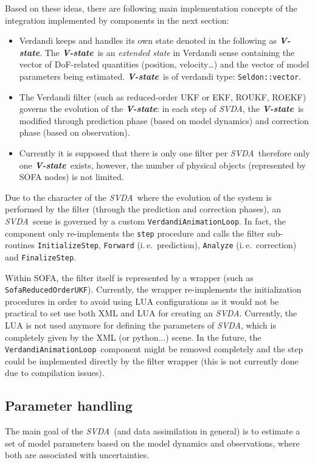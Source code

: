\documentclass[10pt]{article}
\def\ie{i.\,e.}
\def\vstate{\textit{\textbf{V-state}}}
\def\svda{\textit{SVDA}}
\def\veal{\texttt{VerdandiAnimationLoop}}
\def\sroukf{\texttt{SofaReducedOrderUKF}}
\begin{document}
Based on these ideas, there are following main implementation concepts of the integration implemented by components in the next section:
\begin{itemize}
\item Verdandi keeps and handles its own state denoted in the following as \vstate. The \vstate\ is an \emph{extended state} in Verdandi sense containing the vector of DoF-related quantities (position, velocity\ldots) and the vector of model parameters being estimated. \vstate\ is of verdandi type: \texttt{Seldon::vector}.
\item The Verdandi filter (such as reduced-order UKF or EKF, ROUKF, ROEKF) governs the evolution of the \vstate: in each step of \svda, the \vstate\ is modified through prediction phase (based on model dynamics) and correction phase (based on observation).
\item Currently it is supposed that there is only one filter per \svda\, therefore only one \vstate\ exists, however, the number of physical objects (represented by SOFA nodes) is not limited. 
\end{itemize}
Due to the character of the \svda\ where the evolution of the system is performed by the filter (through the prediction and correction phases), an \svda\ scene is governed by a custom \veal. In fact, the component only re-implements the \texttt{step} procedure and calls the filter sub-routines \texttt{InitializeStep}, \texttt{Forward} (\ie\ prediction), \texttt{Analyze} (\ie\ correction) and \texttt{FinalizeStep}. 

Within SOFA, the filter itself is represented by a wrapper (such as \sroukf). Currently, the wrapper re-implements the initialization procedures in order to avoid using LUA configurations as it would not be practical to set use both XML and LUA for creating an \svda. Currently, the LUA is not used anymore for defining the parameters of \svda, which is completely given by the XML (or python...) scene.
In the future, the \veal\ component might be removed completely and the step could be implemented directly by the filter wrapper (this is not currently done due to compilation issues).


\subsection{Parameter handling}
The main goal of the \svda\ (and data assimilation in general) is to estimate a set of model parameters based on the model dynamics and observations, where both are associated with uncertainties.
\end{document}
